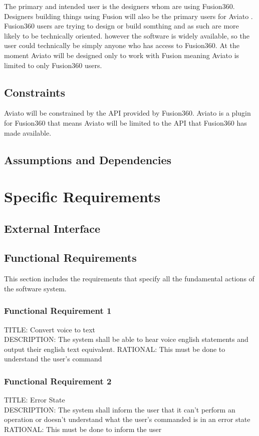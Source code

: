 \documentclass[onecolumn, draftclsnofoot,10pt, compsoc]{IEEEtran}
\def \botname{Aviato }
\begin{document}
		The primary and intended user is the designers whom are using Fusion360. 
		Designers building things using Fusion will also be the primary users for \botname.
		Fusion360 users are trying to design or build somthing and as such are more likely to be technically oriented.
		however the software is widely available, so the user could technically be simply anyone who has access to Fusion360.
		At the moment \botname will be designed only to work with Fusion meaning \botname is limited to only Fusion360 users. 

    \subsection{Constraints}
		\botname will be constrained by the API provided by Fusion360. \botname is a plugin for Fusion360 that means \botname will be limited to the API that Fusion360 has made available. 

    \subsection{Assumptions and Dependencies}


\section{Specific Requirements}
    \subsection{External Interface}
    \subsection{Functional Requirements}
    This section includes the requirements that specify all the fundamental actions of the software system.
    	\subsubsection{Functional Requirement 1}
        TITLE: Convert voice to text \\
        DESCRIPTION: The system shall be able to hear voice english statements and output their english text equivalent.
        RATIONAL: This must be done to understand the user's command 
        
        \subsubsection{Functional Requirement 2}
        TITLE: Error State \\
        DESCRIPTION: The system shall inform the user that it can't perform an operation or doesn't understand what the user's commanded is in an error state \\
        RATIONAL: This must be done to inform the user 
        
\end{document}
